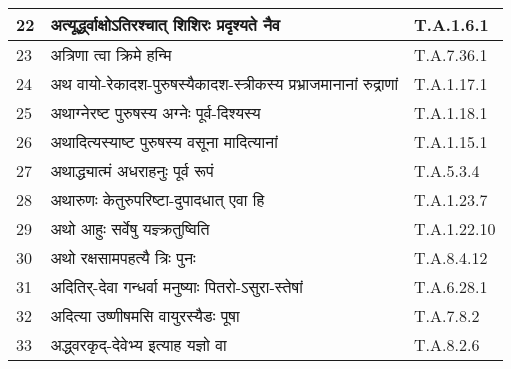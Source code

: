 \documentclass[17pt]{extarticle}
\begin{document}
\begin{longtable}{||p{0.4in}||p{4.9in}||p{0.9in}||}
    22 & अत्यूर्द्ध्वाक्षोऽतिरश्चात् शिशिरः प्रदृश्यते नैव & T.A.1.6.1       \\
    
    \hline
        
    23 & अत्रिणा त्वा क्रिमे हन्मि & T.A.7.36.1       \\
    
    \hline
        
    24 & अथ वायो{-}रेकादश{-}पुरुषस्यैकादश{-}स्त्रीकस्य प्रभ्राजमानानां रुद्राणां & T.A.1.17.1       \\
    
    \hline
        
    25 & अथाग्नेरष्ट पुरुषस्य अग्नेः पूर्व{-}दिश्यस्य & T.A.1.18.1       \\
    
    \hline
        
    26 & अथादित्यस्याष्ट पुरुषस्य वसूना मादित्यानां & T.A.1.15.1       \\
    
    \hline
        
    27 & अथाद्ध्यात्मं अधराहनुः पूर्व रूपं & T.A.5.3.4       \\
    
    \hline
        
    28 & अथारुणः केतुरुपरिष्टा{-}दुपादधात् एवा हि & T.A.1.23.7       \\
    
    \hline
        
    29 & अथो आहुः सर्वेषु यज्ञ्क्रतुष्विति & T.A.1.22.10       \\
    
    \hline
        
    30 & अथो रक्षसामपहत्यै त्रिः पुनः & T.A.8.4.12       \\
    
    \hline
        
    31 & अदितिर्{-}देवा गन्धर्वा मनुष्याः पितरो{-}ऽसुरा{-}स्तेषां & T.A.6.28.1       \\
    
    \hline
        
    32 & अदित्या उष्णीषमसि वायुरस्यैडः पूषा & T.A.7.8.2       \\
    
    \hline
        
    33 & अद्ध्वरकृद्{-}देवेभ्य इत्याह यज्ञो वा & T.A.8.2.6       \\
    
    \hline
        

\end{longtable}
\end{document}

